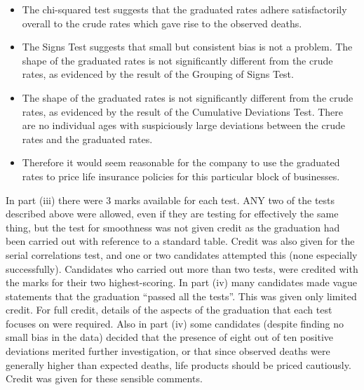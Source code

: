 \begin{itemize}
\item The chi-squared test suggests that the graduated rates adhere satisfactorily overall to
the crude rates which gave rise to the observed deaths.
\item The Signs Test suggests that small but consistent bias is not a problem.
The shape of the graduated rates is not significantly different from the crude rates, as
evidenced by the result of the Grouping of Signs Test.
\item The shape of the graduated rates is not significantly different from the crude rates, as
evidenced by the result of the Cumulative Deviations Test.
There are no individual ages with suspiciously large deviations between the crude
rates and the graduated rates.
\item Therefore it would seem reasonable for the company to use the graduated rates to
price life insurance policies for this particular block of businesses.
\end{itemize}

In part (iii) there were 3 marks available for each test. ANY two of the tests described above were allowed, even if they are testing for effectively the same thing, but the test for
smoothness was not given credit as the graduation had been carried out with reference to a standard table. Credit was also given for the serial correlations test, and one or two
candidates attempted this (none especially successfully). Candidates who carried out more than two tests, were credited with the marks for their two highest-scoring. In part (iv) many
candidates made vague statements that the graduation “passed all the tests”. This was given only limited credit. For full credit, details of the aspects of the graduation that each test
focuses on were required. Also in part (iv) some candidates (despite finding no small bias in the data) decided that the presence of eight out of ten positive deviations merited further
investigation, or that since observed deaths were generally higher than expected deaths, life products should be priced cautiously. Credit was given for these sensible comments.



